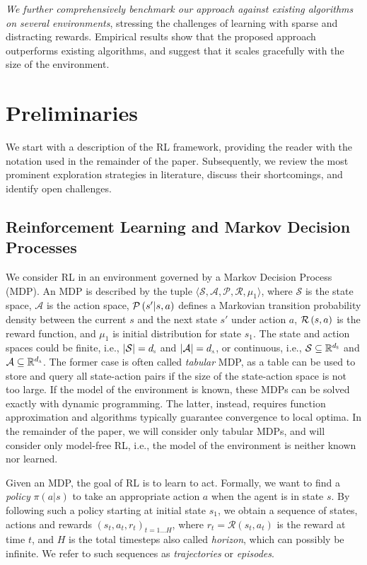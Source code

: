 \documentclass{article}
\newcommand{\textsub}[1]{\textsc{\tiny #1}} \newcommand{\func}[2]{\textsf{#1}(#2)} \newcommand{\hl}[1]{\textcolor{red}{{#1}}} \newcommand{\hll}[1]{\textcolor{blue}{{#1}}}
\newcommand{\realspace}{\mathbb R}
\newcommand{\action}{a}
\newcommand{\state}{s}
\newcommand{\statespace}{\mathcal S}
\newcommand{\actionspace}{\mathcal A}
\newcommand{\dstate}{d_{\textsub{\state}}}
\newcommand{\daction}{d_{\textsub{\action}}}
\providecommand{\rwd}{\mathcal{R}}
\providecommand{\prob}{\mathcal{P}}
\newcommand{\rmodel}[1][]{\ifthenelse{\equal{#1}{}}{\rwd\left(\state,\action\right)}{\rwd\left(\state^{[#1]},\action^{[#1]}\right)}}
\newcommand{\pmodel}[1][]{\ifthenelse{\equal{#1}{}}{\prob\left(\state'|\state,\action\right)}{\prob\left(\state^{[#1+1]}|\state^{[#1]},\action^{[#1]}\right)}}
\begin{document}
\textit{We further comprehensively benchmark our approach against existing algorithms on several environments}, stressing the challenges of learning with sparse and distracting rewards. 
Empirical results show that the proposed approach outperforms existing algorithms, and suggest that it scales gracefully with the size of the environment.




\section{Preliminaries}
\label{sec:preliminaries}
We start with a description of the RL framework, providing the reader with the notation used in the remainder of the paper. Subsequently, we review the most prominent exploration strategies in literature, discuss their shortcomings, and identify open challenges.

\subsection{Reinforcement Learning and Markov Decision Processes}
\label{ssec:mdp}
We consider RL in an environment governed by a Markov Decision Process (MDP). An MDP is described by the tuple $\langle \statespace, \actionspace, \prob, \rwd, \mu_1 \rangle$, where $\statespace$ is the state space, $\actionspace$ is the action space, $\pmodel$ defines a Markovian transition probability density between the current $\state$ and the next state $\state'$ under action
$\action$, $\rmodel$ is the reward function, and $\mu_1$ is initial distribution for state $s_1$.
The state and action spaces could be finite, i.e., $|\statespace| = \dstate$ and $|\actionspace| = \daction$, or continuous, i.e., $\statespace \subseteq \realspace^{\dstate}$ and $\actionspace \subseteq \realspace^{\daction}$. The former case is often called \textit{tabular} MDP, as a table can be used to store and query all state-action pairs if the size of the state-action space is not too large. If the model of the environment is known, these MDPs can be solved exactly with dynamic programming.
The latter, instead, requires function approximation and algorithms typically guarantee convergence to local optima.
In the remainder of the paper, we will consider only tabular MDPs, and will consider only model-free RL, i.e., the model of the environment is neither known nor learned.

Given an MDP, the goal of RL is to learn to act. Formally, we want to find a \emph{policy} $\pi(a|s)$ to take an appropriate action $a$ when the agent is in state $s$. By following such a policy starting at initial state $s_1$, we obtain a sequence of states, actions and rewards $(\state_t, \action_t, r_t)_{t=1\ldots H}$, where $r_t = \rwd(s_t, a_t)$ is the reward at time $t$, and $H$ is the total timesteps also called \textit{horizon}, which can possibly be infinite. We refer to such sequences as \emph{trajectories} or \emph{episodes}.
\end{document}
